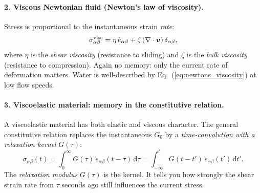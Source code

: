 \documentclass[12pt,letterpaper]{article}
\newcommand{\dd}{\mathrm{d}}
\theoremstyle{definition}
\begin{document}
\paragraph{2. Viscous Newtonian fluid (Newton's law of viscosity).}
Stress is proportional to the instantaneous strain \emph{rate}:
\begin{equation}
  \sigma_{\alpha\beta}^{\rm visc}
  = \eta\,\dot{e}_{\alpha\beta}
  + \zeta\,(\nabla\cdot\bm{v})\,\delta_{\alpha\beta},
  \label{eq:newtons_viscosity}
\end{equation}
where $\eta$ is the \emph{shear viscosity} (resistance to sliding)
and $\zeta$ is the \emph{bulk viscosity} (resistance to compression).
Again no memory: only the current rate of deformation matters.
Water is well-described by Eq.~(\ref{eq:newtons_viscosity}) at low flow speeds.

\paragraph{3. Viscoelastic material: memory in the constitutive relation.}
A viscoelastic material has both elastic and viscous character.
The general constitutive relation replaces the instantaneous $G_0$
by a \emph{time-convolution with a relaxation kernel} $G(\tau)$:
\begin{equation}
  \sigma_{\alpha\beta}(t)
  = \int_0^\infty G(\tau)\,\dot{e}_{\alpha\beta}(t-\tau)\,\dd\tau
  = \int_{-\infty}^t G(t-t')\,\dot{e}_{\alpha\beta}(t')\,\dd t'.
  \label{eq:viscoelastic}
\end{equation}
The \emph{relaxation modulus} $G(\tau)$ is the kernel.  It tells you
how strongly the shear strain rate from $\tau$ seconds ago still
influences the current stress.
\end{document}
